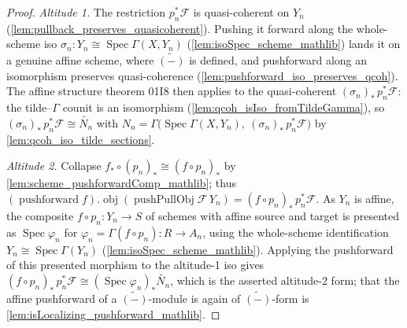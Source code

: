 \begin{proof}
  \emph{Altitude 1.} The restriction \(p_n^*\mathcal{F}\) is quasi-coherent on \(Y_n\)
  (\cref{lem:pullback_preserves_quasicoherent}). Pushing it forward along the whole-scheme
  iso \(\sigma_n : Y_n \cong \operatorname{Spec}\Gamma(X, Y_n)\) (\cref{lem:isoSpec_scheme_mathlib})
  lands it on a genuine affine scheme, where \(\widetilde{(-)}\) is defined, and pushforward
  along an isomorphism preserves quasi-coherence (\cref{lem:pushforward_iso_preserves_qcoh}).
  The affine structure theorem 01I8 then applies to the quasi-coherent
  \((\sigma_n)_*\,p_n^*\mathcal{F}\): the tilde--\(\Gamma\) counit is an isomorphism
  (\cref{lem:qcoh_isIso_fromTildeGamma}), so
  \((\sigma_n)_*\,p_n^*\mathcal{F} \cong \widetilde{N_n}\) with
  \(N_n = \Gamma\bigl(\operatorname{Spec}\Gamma(X, Y_n),\ (\sigma_n)_*\,p_n^*\mathcal{F}\bigr)\)
  by \cref{lem:qcoh_iso_tilde_sections}.

  \emph{Altitude 2.} Collapse \(f_* \circ (p_n)_* \cong (f \circ p_n)_*\) by
  \cref{lem:scheme_pushforwardComp_mathlib}; thus
  \((\operatorname{pushforward} f).\operatorname{obj}(\operatorname{pushPullObj}\mathcal{F}\,
  Y_n) = (f \circ p_n)_*\,p_n^*\mathcal{F}\). As \(Y_n\) is affine, the composite
  \(f \circ p_n : Y_n \to S\) of schemes with affine source and target is presented as
  \(\operatorname{Spec}\varphi_n\) for \(\varphi_n = \Gamma(f \circ p_n) : R \to A_n\),
  using the whole-scheme identification \(Y_n \cong \operatorname{Spec}\Gamma(Y_n)\)
  (\cref{lem:isoSpec_scheme_mathlib}). Applying the
  pushforward of this presented morphism to the altitude-1 iso gives
  \((f \circ p_n)_*\,p_n^*\mathcal{F} \cong (\operatorname{Spec}\varphi_n)_*\widetilde{N_n}\),
  which is the asserted altitude-2 form; that the affine pushforward of a
  \(\widetilde{(-)}\)-module is again of \(\widetilde{(-)}\)-form
  is \cref{lem:isLocalizing_pushforward_mathlib}.
\end{proof}

